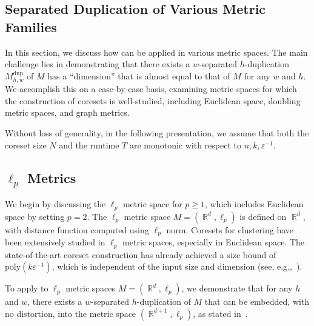 \documentclass[letterpaper,11pt]{article}
\theoremstyle{plain}
\theoremstyle{definition}
\theoremstyle{remark}
\DeclareMathOperator{\R}{\mathbb{R}}
\newcommand{\dup}{\mathrm{dup}}
\newcommand{\eps}{\varepsilon}
\begin{document}
\begin{appendices}
      \section{Separated Duplication of Various Metric Families}
\label{sec:application}
In this section, we discuss how  can be applied in various metric spaces. The main challenge lies in demonstrating that there exists a $w$-separated $h$-duplication $M^\dup_{h,w}$ of $M$ has a ``dimension'' that is almost equal to that of $M$ for any $w$ and $h$. We accomplish this on a case-by-case basis, examining metric spaces for which the construction of coresets is well-studied, including Euclidean space, doubling metric spaces, and graph metrics.

Without loss of generality, in the following presentation, we assume that both the coreset size $N$ and the runtime $T$ are monotonic with respect to $n,k,\eps^{-1}$.


\subsection{$\ell_p$ Metrics}

We begin by discussing the $\ell_p$ metric space for $p\ge 1$, which includes Euclidean space by setting $p=2$. The $\ell_p$ metric space $M=(\R^d, \ell_p)$ is defined on $\R^d$, with distance function computed using $\ell_p$ norm. 
Coresets for clustering have been extensively studied in $\ell_p$ metric spaces, especially in Euclidean space. The state-of-the-art coreset construction has already achieved a size bound of $\text{poly}(k\eps^{-1})$, which is independent of the input size and dimension (see, e.g.,~\cite{Cohen-addad2021New}). 

To apply  to $\ell_p$ metric spaces $M=(\R^d, \ell_p)$, we demonstrate that for any $h$ and $w$, there exists a $w$-separated $h$-duplication of $M$ that can be embedded, with no distortion, into the metric space $(\R^{d+1}, \ell_p)$, as stated in~. 



\end{appendices}
\end{document}
